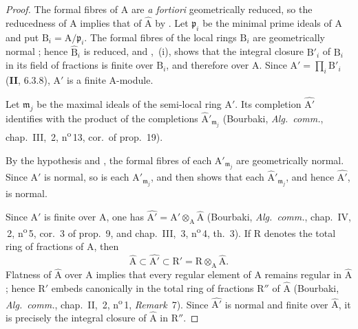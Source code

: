 \begin{proof}
The formal fibres of $\mathrm{A}$ are \emph{a fortiori} geometrically reduced, so the reducedness of $\mathrm{A}$ implies that of $\widehat{\mathrm{A}}$ by . Let $\mathfrak{p}_i$ be the minimal prime ideals of $\mathrm{A}$ and put $\mathrm{B}_i=\mathrm{A}/\mathfrak{p}_i$. The formal fibres of the local rings $\mathrm{B}_i$ are geometrically normal ; hence $\widehat{\mathrm{B}}_i$ is reduced, and ,~(i), shows that the integral closure $\mathrm{B}'_i$ of $\mathrm{B}_i$ in its field of fractions is finite over $\mathrm{B}_i$, and therefore over $\mathrm{A}$. Since $\mathrm{A}'=\prod_i\mathrm{B}'_i$ (\textbf{II}, $6.3.8$), $\mathrm{A}'$ is a finite $\mathrm{A}$-module.

Let $\mathfrak{m}_j$ be the maximal ideals of the semi-local ring $\mathrm{A}'$. Its completion $\widehat{\mathrm{A}'}$ identifies with the product of the completions $\widehat{\mathrm{A}}'_{\mathfrak{m}_j}$ (Bourbaki, \emph{Alg.\ comm.}, chap.~III, \textsection\,2, n\textsuperscript{o}\,13, cor.~of prop.~19).


By the hypothesis and , the formal fibres of each $\mathrm{A}'_{\mathfrak{m}_j}$ are geometrically normal. Since $\mathrm{A}'$ is normal, so is each $\mathrm{A}'_{\mathfrak{m}_j}$, and  then shows that each $\widehat{\mathrm{A}}'_{\mathfrak{m}_j}$, and hence $\widehat{\mathrm{A}'}$, is normal.

Since $\mathrm{A}'$ is finite over $\mathrm{A}$, one has $\widehat{\mathrm{A}'}=\mathrm{A}'\otimes_\mathrm{A}\widehat{\mathrm{A}}$ (Bourbaki, \emph{Alg.\ comm.}, chap.~IV, \textsection\,2, n\textsuperscript{o}\,5, cor.~3 of prop.~9, and chap.~III, \textsection\,3, n\textsuperscript{o}\,4, th.~3). If $\mathrm{R}$ denotes the total ring of fractions of $\mathrm{A}$, then
\[
  \widehat{\mathrm{A}}\subset\widehat{\mathrm{A}'}
  \subset \mathrm{R}'=\mathrm{R}\otimes_\mathrm{A}\widehat{\mathrm{A}}.
\]
Flatness of $\widehat{\mathrm{A}}$ over $\mathrm{A}$ implies that every regular element of $\mathrm{A}$ remains regular in $\widehat{\mathrm{A}}$; hence $\mathrm{R}'$ embeds canonically in the total ring of fractions $\mathrm{R}''$ of $\widehat{\mathrm{A}}$ (Bourbaki, \emph{Alg.\ comm.}, chap.~II, \textsection\,2, n\textsuperscript{o}\,1, \emph{Remark}~7). Since $\widehat{\mathrm{A}'}$ is normal and finite over $\widehat{\mathrm{A}}$, it is precisely the integral closure of $\widehat{\mathrm{A}}$ in $\mathrm{R}''$.
\end{proof}

